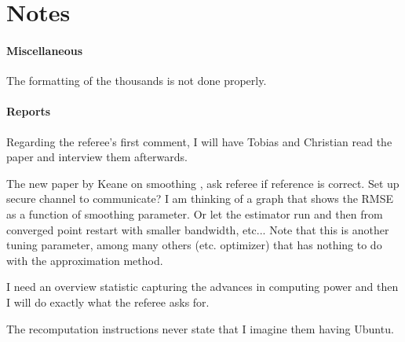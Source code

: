 \section{Notes}


\paragraph{Miscellaneous}

\begin{boenumerate}
\item The formatting of the thousands is not done properly.
\end{boenumerate}

\paragraph{Reports}

\begin{boenumerate}
\item Regarding the referee's first comment, I will have Tobias and Christian read the paper and interview them afterwards.
\item The new paper by Keane on smoothing \citep{Bruins.2015}, ask referee if reference is correct. Set up secure channel to communicate? I am thinking of a graph that shows the RMSE as a function of smoothing parameter. Or let the estimator run and then from converged point restart with smaller bandwidth, etc... Note that this is another tuning parameter, among many others (etc. optimizer) that has nothing to do with the approximation method.
\item I need an overview statistic capturing the advances in computing power and then I will do exactly what the referee asks for.
\item The recomputation instructions never state that I imagine them having Ubuntu.
\end{boenumerate}
